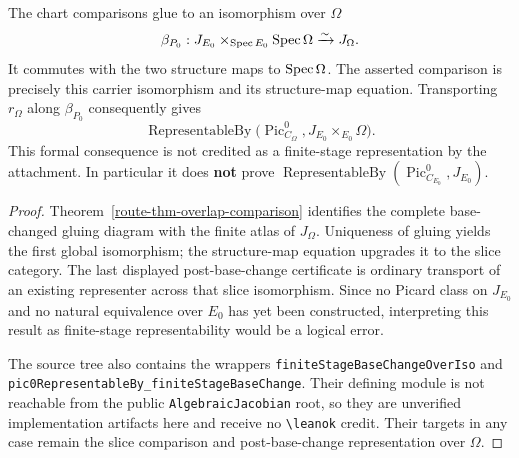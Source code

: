 \begin{theorem}
  \label{route-thm-global-comparison}

  The chart comparisons glue to an isomorphism over \(\Omega\)
  \[
    \beta_{P_0}:
      J_{E_0}\times_{\operatorname{Spec} E_0}\operatorname{Spec}\Omega
        \xrightarrow{\sim}J_\Omega .
  \]
  It commutes with the two structure maps to \(\operatorname{Spec}\Omega\).  The asserted
  comparison is precisely this carrier isomorphism and its structure-map
  equation.  Transporting \(r_\Omega\) along \(\beta_{P_0}\) consequently gives
  \[
    \operatorname{RepresentableBy}
      \bigl(\operatorname{Pic}^0_{C_\Omega},
            J_{E_0}\times_{E_0}\Omega\bigr).
  \]
  This formal consequence is not credited as a finite-stage representation by
  the attachment.  In particular it does \textbf{not} prove
  \(\operatorname{RepresentableBy}
      (\operatorname{Pic}^0_{C_{E_0}},J_{E_0})\).
\end{theorem}

\begin{proof}
  Theorem~\ref{route-thm-overlap-comparison} identifies the complete
  base-changed gluing diagram with the finite atlas of \(J_\Omega\).
  Uniqueness of gluing yields the first global isomorphism; the
  structure-map equation upgrades it to the slice category.  The last
  displayed post-base-change certificate is ordinary transport of an
  existing representer across that slice isomorphism.  Since no Picard class
  on \(J_{E_0}\) and no natural equivalence over \(E_0\) has yet been constructed,
  interpreting this result as finite-stage representability would be a
  logical error.

  The source tree also contains the wrappers
  \texttt{finiteStageBaseChangeOverIso} and
  \texttt{pic0RepresentableBy\_finiteStageBaseChange}.  Their defining module
  is not reachable from the public \texttt{AlgebraicJacobian} root, so they are
  unverified implementation artifacts here and receive no
  \texttt{\textbackslash leanok} credit.  Their targets in any case remain the
  slice comparison and post-base-change representation over \(\Omega\).
\end{proof}
